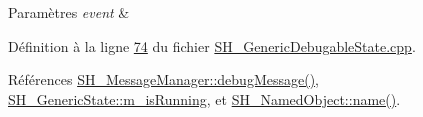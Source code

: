 \begin{DoxyParams}{Paramètres}
{\em event} & \\
\hline
\end{DoxyParams}


Définition à la ligne \hyperlink{SH__GenericDebugableState_8cpp_source_l00074}{74} du fichier \hyperlink{SH__GenericDebugableState_8cpp_source}{S\-H\-\_\-\-Generic\-Debugable\-State.\-cpp}.



Références \hyperlink{classSH__MessageManager_a379f2aa0a590a5add34dbe91f98b2ff7}{S\-H\-\_\-\-Message\-Manager\-::debug\-Message()}, \hyperlink{classSH__GenericState_a72ddc905cfbffbed48bb2f2474d5297a}{S\-H\-\_\-\-Generic\-State\-::m\-\_\-is\-Running}, et \hyperlink{classSH__NamedObject_a9f686c6f2a5bcc08ad03d0cee0151f0f}{S\-H\-\_\-\-Named\-Object\-::name()}.


